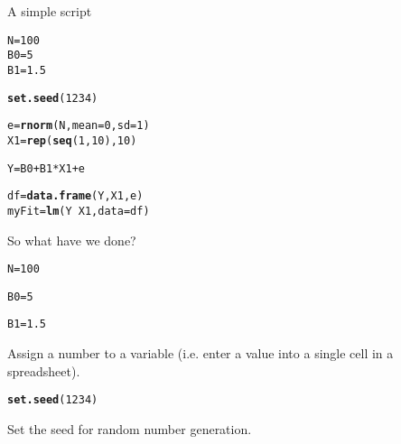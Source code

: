 \documentclass[xcolor=dvipsnames]{beamer}
\makeatletter
\newcommand{\hlnum}[1]{\textcolor[rgb]{0.686,0.059,0.569}{#1}}%
\newcommand{\hlopt}[1]{\textcolor[rgb]{0,0,0}{#1}}%
\newcommand{\hlstd}[1]{\textcolor[rgb]{0.345,0.345,0.345}{#1}}%
\newcommand{\hlkwb}[1]{\textcolor[rgb]{0.69,0.353,0.396}{#1}}%
\newcommand{\hlkwc}[1]{\textcolor[rgb]{0.333,0.667,0.333}{#1}}%
\newcommand{\hlkwd}[1]{\textcolor[rgb]{0.737,0.353,0.396}{\textbf{#1}}}%
\newenvironment{kframe}{%
 \def\at@end@of@kframe{}%
 \ifinner\ifhmode%
  \def\at@end@of@kframe{\end{minipage}}%
  \begin{minipage}{\columnwidth}%
 \fi\fi%
 \def\FrameCommand##1{\hskip\@totalleftmargin \hskip-\fboxsep
 \colorbox{shadecolor}{##1}\hskip-\fboxsep
     \hskip-\linewidth \hskip-\@totalleftmargin \hskip\columnwidth}%
 \MakeFramed {\advance\hsize-\width
   \@totalleftmargin\z@ \linewidth\hsize
   \@setminipage}}%
 {\par\unskip\endMakeFramed%
 \at@end@of@kframe}
\newenvironment{knitrout}{}{} %
\makeatother
\begin{document}
\begin{frame}[fragile]{A simple script}
\begin{knitrout}
\color{fgcolor}\begin{kframe}
\begin{alltt}
\hlstd{N} \hlkwb{=} \hlnum{100}
\hlstd{B0} \hlkwb{=} \hlnum{5}
\hlstd{B1} \hlkwb{=} \hlnum{1.5}

\hlkwd{set.seed}\hlstd{(}\hlnum{1234}\hlstd{)}

\hlstd{e} \hlkwb{=} \hlkwd{rnorm}\hlstd{(N,} \hlkwc{mean} \hlstd{=} \hlnum{0}\hlstd{,} \hlkwc{sd} \hlstd{=} \hlnum{1}\hlstd{)}
\hlstd{X1} \hlkwb{=} \hlkwd{rep}\hlstd{(}\hlkwd{seq}\hlstd{(}\hlnum{1}\hlstd{,} \hlnum{10}\hlstd{),} \hlnum{10}\hlstd{)}

\hlstd{Y} \hlkwb{=} \hlstd{B0} \hlopt{+} \hlstd{B1} \hlopt{*} \hlstd{X1} \hlopt{+} \hlstd{e}

\hlstd{df} \hlkwb{=} \hlkwd{data.frame}\hlstd{(Y, X1, e)}
\hlstd{myFit} \hlkwb{=} \hlkwd{lm}\hlstd{(Y} \hlopt{~} \hlstd{X1,} \hlkwc{data} \hlstd{= df)}
\end{alltt}
\end{kframe}
\end{knitrout}

\end{frame}

\begin{frame}[fragile]{So what have we done?}
\begin{knitrout}
\color{fgcolor}\begin{kframe}
\begin{alltt}
\hlstd{N} \hlkwb{=} \hlnum{100}

\hlstd{B0} \hlkwb{=} \hlnum{5}

\hlstd{B1} \hlkwb{=} \hlnum{1.5}
\end{alltt}
\end{kframe}
\end{knitrout}

Assign a number to a variable (i.e. enter a value into a single cell in a spreadsheet).
\end{frame}

\begin{frame}[fragile]
\begin{knitrout}
\color{fgcolor}\begin{kframe}
\begin{alltt}
\hlkwd{set.seed}\hlstd{(}\hlnum{1234}\hlstd{)}
\end{alltt}
\end{kframe}
\end{knitrout}

Set the seed for random number generation.
\end{frame}
\end{document}
